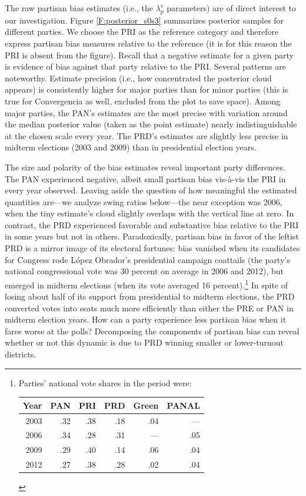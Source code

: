 \documentclass[letter,12pt]{article}
\begin{document}

The raw partisan bias estimates (i.e., the $\lambda_p^v$ parameters) are of direct interest to our investigation. Figure \ref{F:posterior_s0s3} summarizes posterior samples for different parties. We choose the PRI as the reference category and therefore express partisan bias measures relative to the reference (it is for this reason the PRI is absent from the figure). Recall that a negative estimate for a given party is evidence of bias against that party relative to the PRI. Several patterns are noteworthy. Estimate precision (i.e., how concentrated the posterior cloud appears) is consistently higher for major parties than for minor parties (this is true for Convergencia as well, excluded from the plot to save space). Among major parties, the PAN's estimates are the most precise with variation around the median posterior value (taken as the point estimate) nearly indistinguishable at the chosen scale every year. The PRD's estimates are slightly less precise in midterm elections (2003 and 2009) than in presidential election years.  

The size and polarity of the bias estimates reveal important party differences. The PAN experienced negative, albeit small partisan bias vis-\`a-vis the PRI in every year observed. Leaving aside the question of how meaningful the estimated quantities are---we analyze swing ratios below---the near exception was 2006, when the tiny estimate's cloud slightly overlaps with the vertical line at zero. In contrast, the PRD experienced favorable and substantive bias relative to the PRI in some years but not in others. Paradoxically, partisan bias in favor of the leftist PRD is a mirror image of its electoral fortunes: bias vanished when its candidates for Congress rode L\'opez Obrador's presidential campaign coattails (the party's national congressional vote was 30 percent on average in 2006 and 2012), but emerged in midterm elections (when its vote averaged 16 percent).\footnote{Parties' national vote shares in the period were: \begin{tabular}{rrrrrr} Year & PAN & PRI & PRD & Green & PANAL \\ \hline 2003 & .32 & .38 & .18 & .04 & --- \\ 2006 & .34 & .28 & .31 & --- & .05 \\ 2009 & .29 & .40 & .14 & .06 & .04 \\ 2012 & .27 & .38 & .28 & .02 & .04 \\ \end{tabular}} In spite of losing about half of its support from presidential to midterm elections, the PRD converted votes into seats much more efficiently than either the PRE or PAN in midterm election years. How can a party experience less partisan bias when it fares worse at the polls? Decomposing the components of partisan bias can reveal whether or not this dynamic is due to PRD winning smaller or lower-turnout districts.
\end{document}
